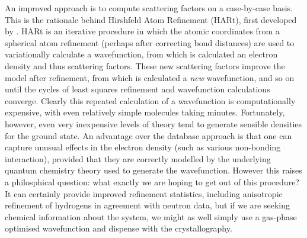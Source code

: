 \begin{refsection}
An improved approach is to compute scattering factors on a case-by-case basis.
This is the rationale behind Hirshfeld Atom Refinement (HARt), first developed by \citeauthor{Jayatilaka2008}.\autocite{Jayatilaka2008}
HARt is an iterative procedure in which the atomic coordinates from a spherical atom refinement (perhaps after correcting  bond distances) are used to variationally calculate a wavefunction, from which is calculated an electron density and thus scattering factors.
These new scattering factors improve the model after refinement, from which is calculated a \emph{new} wavefunction, and so on until the cycles of least squares refinement and wavefunction calculations converge.
Clearly this repeated calculation of a wavefunction is computationally expensive, with even relatively simple molecules taking minutes.
Fortunately, however, even very inexpensive levels of theory tend to generate sensible densities for the ground state.
An advantage over the database approach is that one can capture unusual effects in the electron density (such as various non-bonding interaction), provided that they are correctly modelled by the underlying quantum chemistry theory used to generate the wavefunction.
However this raises a philosphical question: what exactly we are hoping to get out of this procedure?
It can certainly provide improved refinement statistics, including anisotropic refinement of hydrogens in agreement with neutron data, but if we are seeking chemical information about the system, we might as well simply use a gas-phase optimised wavefunction and dispense with the crystallography.


\end{refsection}
